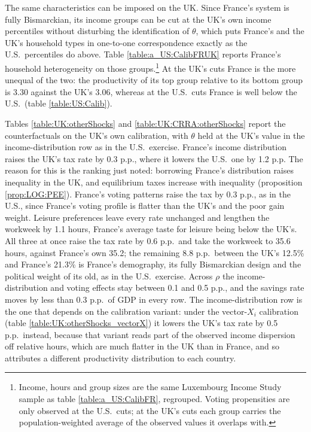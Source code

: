 

The same characteristics can be imposed on the UK. Since France's system is fully Bismarckian, its income groups can be cut at the UK's own income percentiles without disturbing the identification of $\theta$, which puts France's and the UK's household types in one-to-one correspondence exactly as the U.S.\ percentiles do above. Table \ref{table:a_US:CalibFRUK} reports France's household heterogeneity on those groups.\footnote{Income, hours and group sizes are the same Luxembourg Income Study sample as table \ref{table:a_US:CalibFR}, regrouped. Voting propensities are only observed at the U.S.\ cuts; at the UK's cuts each group carries the population-weighted average of the observed values it overlaps with.} At the UK's cuts France is the more unequal of the two: the productivity of its top group relative to its bottom group is 3.30 against the UK's 3.06, whereas at the U.S.\ cuts France is well below the U.S.\ (table \ref{table:US:Calib}).



Tables \ref{table:UK:otherShocks} and \ref{table:UK:CRRA:otherShocks} report the counterfactuals on the UK's own calibration, with $\theta$ held at the UK's value in the income-distribution row as in the U.S.\ exercise. France's income distribution raises the UK's tax rate by 0.3 p.p., where it lowers the U.S.\ one by 1.2 p.p. The reason for this is the ranking just noted: borrowing France's distribution raises inequality in the UK, and equilibrium taxes increase with inequality (proposition \ref{prop:LOG:PEE}). France's voting patterns raise the tax by 0.3 p.p., as in the U.S., since France's voting profile is flatter than the UK's and the poor gain weight. Leisure preferences leave every rate unchanged and lengthen the workweek by 1.1 hours, France's average taste for leisure being below the UK's. All three at once raise the tax rate by 0.6 p.p.\ and take the workweek to 35.6 hours, against France's own 35.2; the remaining 8.8 p.p.\ between the UK's 12.5\% and France's 21.3\% is France's demography, its fully Bismarckian design and the political weight of its old, as in the U.S.\ exercise. Across $\rho$ the income-distribution and voting effects stay between 0.1 and 0.5 p.p., and the savings rate moves by less than 0.3 p.p.\ of GDP in every row. The income-distribution row is the one that depends on the calibration variant: under the vector-$X_i$ calibration (table \ref{table:UK:otherShocks_vectorX}) it lowers the UK's tax rate by 0.5 p.p.\ instead, because that variant reads part of the observed income dispersion off relative hours, which are much flatter in the UK than in France, and so attributes a different productivity distribution to each country.

